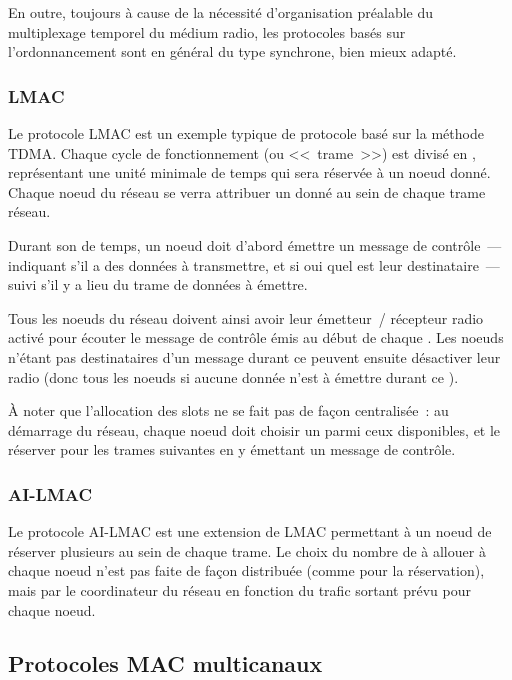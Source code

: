 En outre, toujours à cause de la nécessité d'organisation préalable
du multiplexage temporel du médium radio, les protocoles basés sur
l'ordonnancement sont en général du type synchrone, bien mieux adapté.

\subsubsection{LMAC}
\label{ParLMAC}

Le protocole LMAC \cite{LMAC} est un exemple typique de protocole basé
sur la méthode TDMA. Chaque cycle de fonctionnement (ou <<~trame~>>)
est divisé en , représentant une unité minimale de temps
qui sera réservée à un noeud donné. Chaque noeud du réseau se verra
attribuer un  donné au sein de chaque trame réseau.

Durant son  de temps, un noeud doit d'abord émettre un
message de contrôle~--- indiquant s'il a des données à transmettre,
et si oui quel est leur destinataire~--- suivi s'il y a lieu du trame
de données à émettre.

Tous les noeuds du réseau doivent ainsi avoir leur émetteur~/ récepteur
radio activé pour écouter le message de contrôle émis au début de chaque
. Les noeuds n'étant pas destinataires d'un message durant ce
 peuvent ensuite désactiver leur radio (donc tous les
noeuds si aucune donnée n'est à émettre durant ce ).

À noter que l'allocation des slots ne se fait pas de façon centralisée~:
au démarrage du réseau, chaque noeud doit choisir un  parmi
ceux disponibles, et le réserver pour les trames suivantes en y émettant
un message de contrôle.

\subsubsection{AI-LMAC}
\label{ParAILMAC}

Le protocole AI-LMAC \cite{AILMAC} est une extension de LMAC permettant
à un noeud de réserver plusieurs  au sein de chaque trame.
Le choix du nombre de  à allouer à chaque noeud n'est pas
faite de façon distribuée (comme pour la réservation), mais par le
coordinateur du réseau en fonction du trafic sortant prévu pour
chaque noeud.


\subsection{Protocoles MAC multicanaux}
\label{SubsecProtoMACFDMA}

